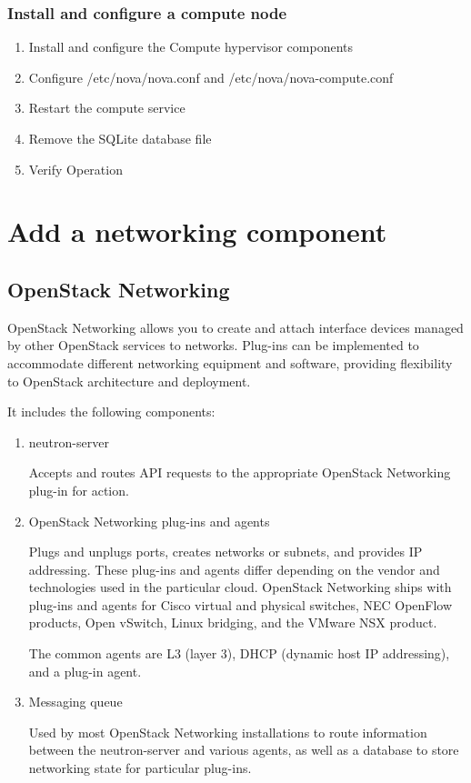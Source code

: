     \subsubsection{Install and configure a compute node}
        \begin{enumerate}
            \item Install and configure the Compute hypervisor components
            \item Configure /etc/nova/nova.conf and /etc/nova/nova-compute.conf
            \item Restart the compute service
            \item Remove the SQLite database file
            \item Verify Operation
        \end{enumerate}


\section{Add a networking component}

    \subsection{OpenStack Networking}
    \par OpenStack Networking allows you to create and attach interface devices managed by other OpenStack services to networks. Plug-ins can be implemented to accommodate different networking equipment and software, providing flexibility to OpenStack architecture and deployment.

    \par It includes the following components:
    
    \begin{enumerate}
        \item neutron-server
        \par Accepts and routes API requests to the appropriate OpenStack Networking plug-in for action.

        \item OpenStack Networking plug-ins and agents
        \par Plugs and unplugs ports, creates networks or subnets, and provides IP addressing. These plug-ins and agents differ depending on the vendor and technologies used in the particular cloud. OpenStack Networking ships with plug-ins and agents for Cisco virtual and physical switches, NEC OpenFlow products, Open vSwitch, Linux bridging, and the VMware NSX product.
        \par The common agents are L3 (layer 3), DHCP (dynamic host IP addressing), and a plug-in agent.
        
        \item Messaging queue
        \par Used by most OpenStack Networking installations to route information between the neutron-server and various agents, as well as a database to store networking state for particular plug-ins.
    \end{enumerate}
    
